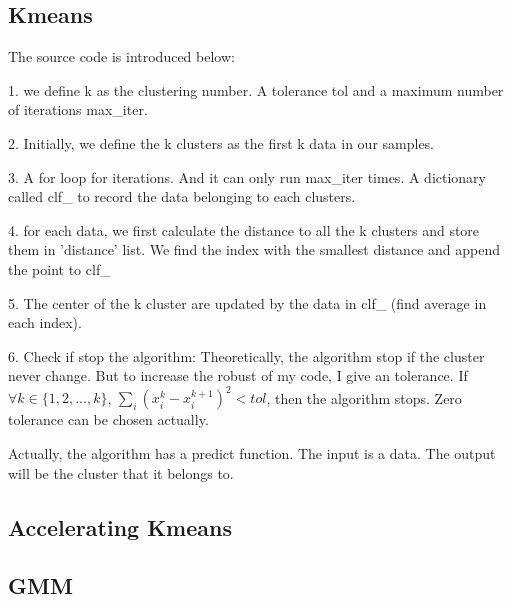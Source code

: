 \documentclass{article}[12]
\begin{document}
\subsection{Kmeans}
The source code is introduced below:\par
1. we define k as the clustering number. A tolerance tol and a maximum number of iterations max\_iter.\par
2. Initially, we define the k clusters as the first k data in our samples.\par
3. A for loop for iterations. And it can only run max\_iter times. A dictionary called clf\_ to record the data belonging to each clusters.\par
4. for each data, we first calculate the distance to all the k clusters and store them in 'distance' list. We find the index with the smallest distance and append the point to clf\_ \par
5. The center of the k cluster are updated by the data in clf\_ (find average in each index).\par
6. Check if stop the algorithm: Theoretically, the algorithm stop if the cluster never change. But to increase the robust of my code, I give an tolerance. If $\forall k \in \{1,2,...,k\}$, $\sum_i (x_i^k-x_i^{k+1})^2 < tol$, then the algorithm stops. Zero tolerance can be chosen actually.\par
Actually, the algorithm has a predict function. The input is a data. The output will be the cluster that it belongs to.

\subsection{Accelerating Kmeans}
\subsection{GMM}
\end{document}
